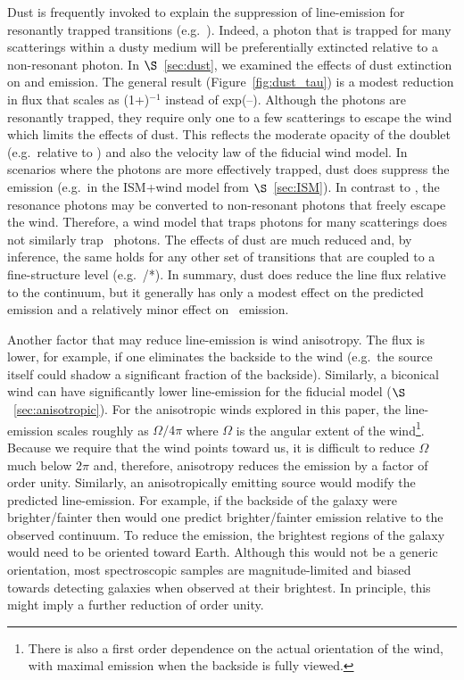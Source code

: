\documentclass[12pt,preprint]{aastex}
\begin{document}
Dust is frequently invoked to explain the suppression of line-emission
for resonantly trapped transitions (e.g.\ \lya).  Indeed, a photon
that is trapped for many scatterings within a dusty medium will 
be preferentially extincted relative to a non-resonant photon.  In
$\S$~\ref{sec:dust}, we examined the effects of dust extinction on 
 and  emission.  The general result
(Figure~\ref{fig:dust_tau}) is a modest
reduction in flux that scales as (1+\taud)$^{-1}$ instead of
exp(--\taud). Although the  photons are resonantly
trapped, they require only one to a few scatterings
to escape the wind which limits the effects of
dust.  This reflects the moderate opacity of the 
doublet (e.g.\ relative to \lya) and also the velocity law of the
fiducial wind model.
In scenarios where the  photons are
more effectively trapped, dust does suppress
the emission (e.g.\ in the ISM+wind model from $\S$~\ref{sec:ISM}).
In contrast to , 
the  resonance photons may be
converted to non-resonant photons that freely escape the wind.
Therefore, a wind model that traps 
photons for many scatterings does not similarly trap 
\feiid\ photons.  The effects of dust are much 
reduced and, by inference, the same holds for any other set of
transitions that are coupled to a fine-structure level (e.g.\
/*).  In summary,
dust does reduce the line flux relative to the continuum, but 
it generally has only a modest effect on the predicted 
emission and a relatively minor effect on \feiis\ emission.

Another factor that may reduce line-emission is %
wind %
anisotropy. The flux is lower, for example, if one
eliminates the backside to the wind (e.g.\ the source itself could
shadow a significant fraction of the backside).  
Similarly, a biconical
wind can have significantly lower line-emission for the fiducial model
($\S$~\ref{sec:anisotropic}). 
For the anisotropic winds explored in this paper,
the line-emission scales 
roughly as $\Omega/4\pi$ where $\Omega$ is the angular extent of the
wind\footnote{There is also a first order dependence on the actual
  orientation of the wind, with maximal emission when the backside is
  fully viewed.}.  Because we require that the wind 
points toward us, it is difficult to reduce $\Omega$ much
below $2 \pi$ and, therefore, anisotropy reduces the
emission by a factor of order unity.  
Similarly, an anisotropically emitting source would modify the predicted
line-emission.  For example, if the backside of the galaxy were
brighter/fainter then would one predict brighter/fainter emission
relative to the observed continuum.
To reduce the emission, the brightest regions
of the galaxy would need to be oriented toward Earth.  Although this
would not be a
generic orientation, most spectroscopic samples are magnitude-limited
and biased towards detecting galaxies when observed at their
brightest.  In principle, this might imply a further
reduction of order unity.
\end{document}

